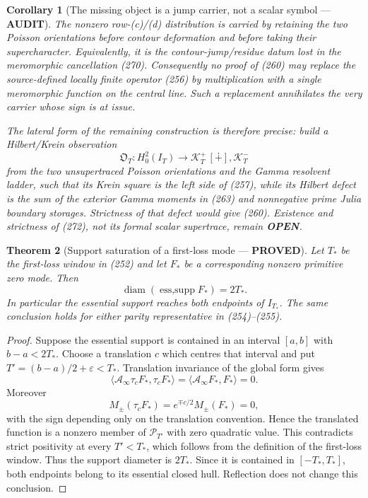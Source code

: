 \documentclass[11pt]{article}
\newtheorem{theorem}{Theorem}
\newtheorem{corollary}[theorem]{Corollary}
\newcommand{\PROVED}{\textcolor{green!45!black}{\textbf{PROVED}}}
\newcommand{\OPEN}{\textcolor{red!70!black}{\textbf{OPEN}}}
\newcommand{\AUDIT}{\textcolor{orange!75!black}{\textbf{AUDIT}}}
\begin{document}
\begin{corollary}[The missing object is a jump carrier, not a scalar
symbol --- \AUDIT]
The nonzero row-(c)/(d) distribution is carried by retaining the two
Poisson orientations before contour deformation and before taking their
supercharacter.  Equivalently, it is the contour-jump/residue datum lost in
the meromorphic cancellation (270).  Consequently no proof of (260) may
replace the source-defined locally finite operator (256) by multiplication
with a single meromorphic function on the central line.  Such a replacement
annihilates the very carrier whose sign is at issue.

The lateral form of the remaining construction is therefore precise: build
a Hilbert/Krein observation
\begin{equation}
 \mathfrak O_T: H_0^2(I_T)\longrightarrow
 \mathscr K_T^+\,[\dotplus],\mathscr K_T^-           \tag{272}
\end{equation}
from the two unsupertraced Poisson orientations and the Gamma resolvent
ladder, such that its Krein square is the left side of (257), while its
Hilbert defect is the sum of the exterior Gamma moments in (263) and
nonnegative prime Julia boundary storages.  Strictness of that defect would
give (260).  Existence and strictness of (272), not its formal scalar
supertrace, remain \OPEN{}.
\end{corollary}

\begin{theorem}[Support saturation of a first-loss mode --- \PROVED]
Let $T_*$ be the first-loss window in (252) and let $F_*$ be a corresponding
nonzero primitive zero mode.  Then
\begin{equation}
 \operatorname{diam}(\operatorname{ess,supp}F_*)=2T_* . \tag{273}
\end{equation}
In particular the essential support reaches both endpoints of $I_{T_*}$.
The same conclusion holds for either parity representative in
(254)--(255).
\end{theorem}

\begin{proof}
Suppose the essential support is contained in an interval $[a,b]$ with
$b-a<2T_*$.  Choose a translation $c$ which centres that interval and put
$T'=(b-a)/2+\varepsilon<T_*$.  Translation invariance of the global form
gives
\[
 \langle\mathcal A_\infty\tau_cF_*,\tau_cF_*\rangle
 =\langle\mathcal A_\infty F_*,F_*\rangle=0.
\]
Moreover
\[
 M_\pm(\tau_cF_*)=e^{\mp c/2}M_\pm(F_*)=0,
\]
with the sign depending only on the translation convention.  Hence the
translated function is a nonzero member of $\mathcal P_{T'}$ with zero
quadratic value.  This contradicts strict positivity at every
$T'<T_*$, which follows from the definition of the first-loss window.
Thus the support diameter is $2T_*$.  Since it is contained in
$[-T_*,T_*]$, both endpoints belong to its essential closed hull.  Reflection
does not change this conclusion.
\end{proof}
\end{document}
